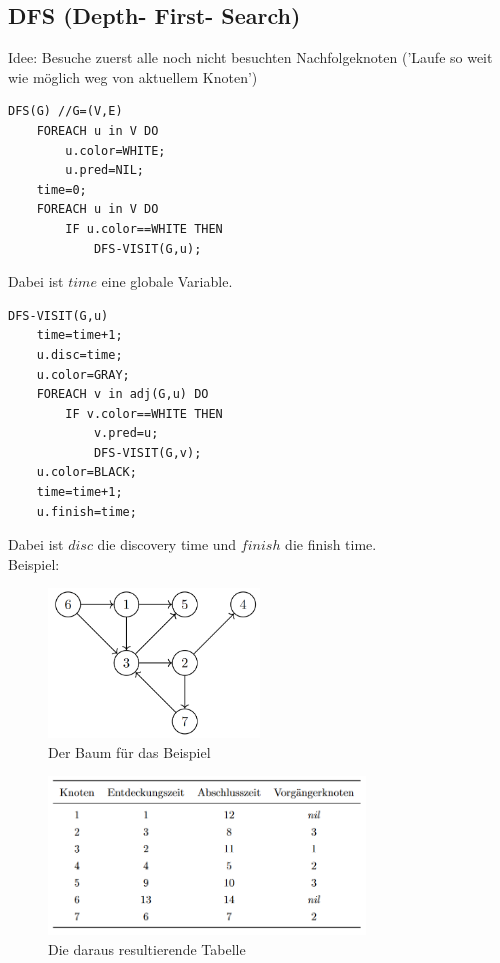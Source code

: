 \documentclass{article}
\begin{document}
        \subsection{DFS (Depth- First- Search)}
            Idee: Besuche zuerst alle noch nicht besuchten Nachfolgeknoten ('Laufe so weit wie möglich weg von aktuellem Knoten')\\
            \begin{lstlisting}[style=pseudocode]
DFS(G) //G=(V,E)
    FOREACH u in V DO
        u.color=WHITE;
        u.pred=NIL;
    time=0;
    FOREACH u in V DO
        IF u.color==WHITE THEN
            DFS-VISIT(G,u);
            \end{lstlisting}
            Dabei ist $time$ eine globale Variable.
            \begin{lstlisting}[style=pseudocode]
DFS-VISIT(G,u)
    time=time+1;
    u.disc=time;
    u.color=GRAY;
    FOREACH v in adj(G,u) DO
        IF v.color==WHITE THEN
            v.pred=u;
            DFS-VISIT(G,v);
    u.color=BLACK;
    time=time+1;
    u.finish=time;
            \end{lstlisting}
            Dabei ist $disc$ die discovery time und $finish$ die finish time. \\
            Beispiel:\\
            \begin{figure}[ht]
                \centering
                \includegraphics[width=0.5\textwidth]{Bilder/DFSBsp.png}
                \caption{Der Baum für das Beispiel}
                \label{fig:DFSBsp}
            \end{figure}
            \begin{figure}[ht]
                \centering
                \includegraphics[width=0.75\textwidth]{Bilder/DFSTab.png}
                \caption{Die daraus resultierende Tabelle}
                \label{fig:DFSTab}
            \end{figure}\\
\end{document}
